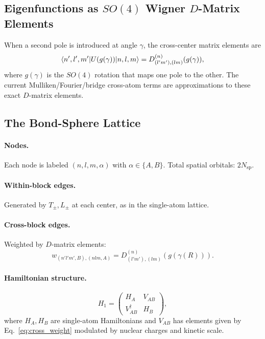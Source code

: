 \documentclass[aps,pra,twocolumn,superscriptaddress,longbibliography]{revtex4-2}
\begin{document}
\subsection{Eigenfunctions as $SO(4)$ Wigner $D$-Matrix Elements}

When a second pole is introduced at angle $\gamma$, the cross-center
matrix elements are
\begin{equation}
\braket{n', l', m' | U(g(\gamma)) | n, l, m}
= D^{(n)}_{(l'm'),(lm)}(g(\gamma)),
\label{eq:D_matrix}
\end{equation}
where $g(\gamma)$ is the $SO(4)$ rotation that maps one pole to the
other.  The current Mulliken/Fourier/bridge cross-atom terms are
approximations to these exact $D$-matrix elements.

\subsection{The Bond-Sphere Lattice}

\paragraph{Nodes.}  Each node is labeled $(n, l, m, \alpha)$ with
$\alpha \in \{A, B\}$.  Total spatial orbitals: $2N_{\text{sp}}$.

\paragraph{Within-block edges.}  Generated by $T_\pm, L_\pm$ at each
center, as in the single-atom lattice.

\paragraph{Cross-block edges.}  Weighted by $D$-matrix elements:
\begin{equation}
w_{(n'l'm',B),(nlm,A)} = D^{(n)}_{(l'm'),(lm)}(g(\gamma(R))).
\label{eq:cross_weight}
\end{equation}

\paragraph{Hamiltonian structure.}
\begin{equation}
H_1 = \begin{pmatrix} H_A & V_{AB} \\ V_{AB}^\dagger & H_B \end{pmatrix},
\label{eq:H1_block}
\end{equation}
where $H_A, H_B$ are single-atom Hamiltonians and $V_{AB}$ has elements
given by Eq.~\eqref{eq:cross_weight} modulated by nuclear charges and
kinetic scale.
\end{document}
